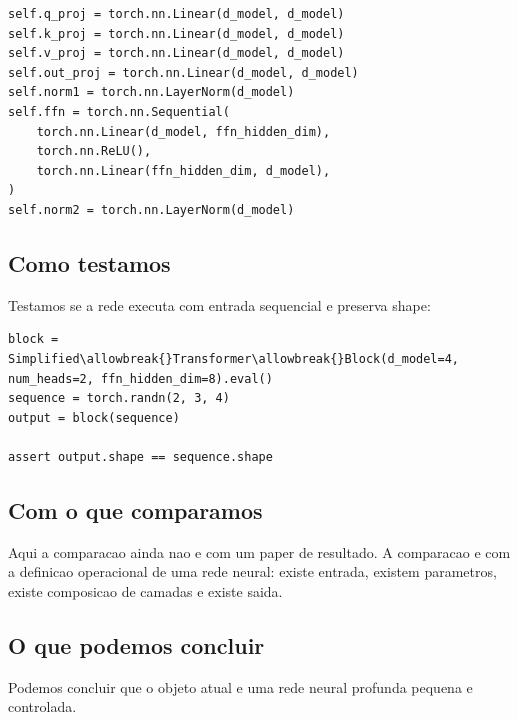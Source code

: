 \begin{Verbatim}[fontsize=\small,breaklines=true,label=python]
self.q_proj = torch.nn.Linear(d_model, d_model)
self.k_proj = torch.nn.Linear(d_model, d_model)
self.v_proj = torch.nn.Linear(d_model, d_model)
self.out_proj = torch.nn.Linear(d_model, d_model)
self.norm1 = torch.nn.LayerNorm(d_model)
self.ffn = torch.nn.Sequential(
    torch.nn.Linear(d_model, ffn_hidden_dim),
    torch.nn.ReLU(),
    torch.nn.Linear(ffn_hidden_dim, d_model),
)
self.norm2 = torch.nn.LayerNorm(d_model)
\end{Verbatim}



\subsection{Como testamos}



Testamos se a rede executa com entrada sequencial e preserva shape:



\begin{Verbatim}[fontsize=\small,breaklines=true,label=python]
block = Simplified\allowbreak{}Transformer\allowbreak{}Block(d_model=4, num_heads=2, ffn_hidden_dim=8).eval()
sequence = torch.randn(2, 3, 4)
output = block(sequence)

assert output.shape == sequence.shape
\end{Verbatim}



\subsection{Com o que comparamos}





Aqui a comparacao ainda nao e com um paper de resultado. A comparacao e com a definicao operacional de uma rede neural: existe entrada, existem parametros, existe composicao de camadas e existe saida.



\subsection{O que podemos concluir}




Podemos concluir que o objeto atual e uma rede neural profunda pequena e controlada.



